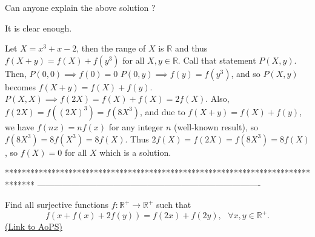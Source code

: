 \begin{solution}
	Can anyone explain the above solution ?
\end{solution}



\begin{solution}
	It is clear enough.

Let $X = x^3+x-2$, then the range of $X$ is $\mathbb{R}$ and thus $f(X+y) = f(X) + f(y^3)$ for all $X,y \in \mathbb{R}$. Call that statement $P(X,y)$. Then,
$P(0,0) \implies f(0) = 0$
$P(0,y) \implies f(y) = f(y^3)$, and so $P(X,y)$ becomes $f(X+y) = f(X) + f(y)$.
$P(X,X) \implies f(2X) = f(X) + f(X) = 2f(X)$.
Also, $f(2X) = f((2X)^3) = f(8X^3)$, and due to $f(X+y) = f(X) + f(y)$, we have $f(nx) = nf(x)$ for any integer $n$ (well-known result), so $f(8X^3) = 8f(X^3) = 8f(X)$. Thus $2f(X) = f(2X) = f(8X^3) = 8f(X)$, so $f(X) = 0$ for all $X$ which is a solution.
\end{solution}
*******************************************************************************
-------------------------------------------------------------------------------

\begin{problem}
	Find all surjective functions $f:\mathbb{R}^+\to \mathbb{R}^+$ such that \[f(x+f(x)+2f(y))=f(2x)+f(2y), \ \ \ \forall x,y \in \mathbb{R}^+.\]
	\flushright \href{https://artofproblemsolving.com/community/c6h613491}{(Link to AoPS)}
\end{problem}



